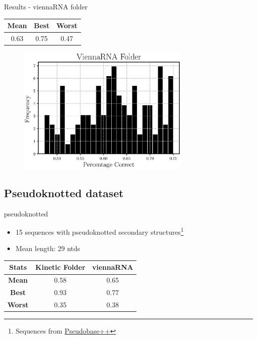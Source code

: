 \documentclass{beamer}
\begin{document}
\begin{frame}{Results - viennaRNA folder}
\begin{table}
\centering
\begin{tabular}{|ccc|}
\hline
{\bf Mean} & {\bf Best} & {\bf Worst}\\
\hline
\hline
0.63 & 0.75 & 0.47\\
\hline
\end{tabular}
\end{table}
\begin{figure}[H]
\centering
\includegraphics[width = 0.75\textwidth]{viennarna.eps}
\end{figure}
\end{frame}

\subsection*{Pseudoknotted dataset}
\begin{frame}{pseudoknotted}
\begin{itemize}
\item 15 sequences with pseudoknotted secondary structures\footnote{Sequences from \href{http://pseudobaseplusplus.utep.edu}{Pseudobase++} }
\item Mean length: 29 ntds
\end{itemize}

\begin{table}
\centering
\begin{tabular}{|ccc|}
\hline
{\bf Stats} & {\bf Kinetic Folder} & {\bf viennaRNA}\\
\hline
\hline
{\bf Mean} & 0.58 & 0.65 \\
{\bf Best} & 0.93 & 0.77 \\
{\bf Worst} & 0.35 & 0.38\\
\hline
\end{tabular}
\end{table}
\end{frame}
\end{document}
